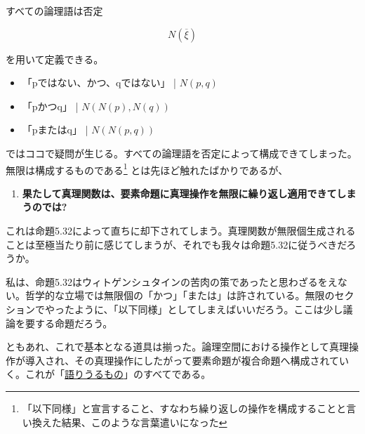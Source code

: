 \documentclass[a4paper,onecolumn,article]{jarticle}
\newcounter{ct}               %
\begin{document}
すべての論理語は否定

\[ N ( \overline{ \xi } ) \]

を用いて定義できる。

\begin{itemize}
  \item 「pではない、かつ、qではない」 | $N(p, q)$
  \item 「pかつq」 | $N(N(p), N(q))$
  \item 「pまたはq」 | $N(N(p, q))$
\end{itemize}

ではココで疑問が生じる。すべての論理語を否定によって構成できてしまった。無限は構成するものである\footnote{「以下同様」と宣言すること、すなわち繰り返しの操作を構成することと言い換えた結果、このような言葉遣いになった}
とは先ほど触れたばかりであるが、

\begin{enumerate}
  \item {\bf 果たして真理関数は、要素命題に真理操作を無限に繰り返し適用できてしまうのでは? }
\end{enumerate}

これは命題5.32によって直ちに却下されてしまう。真理関数が無限個生成されることは至極当たり前に感じてしまうが、それでも我々は命題5.32に従うべきだろうか。

私は、命題5.32はウィトゲンシュタインの苦肉の策であったと思わざるをえない。哲学的な立場では無限個の「かつ」「または」は許されている。無限のセクションでやったように、「以下同様」としてしまえばいいだろう。ここは少し議論を要する命題だろう。

ともあれ、これで基本となる道具は揃った。論理空間における操作として真理操作が導入され、その真理操作にしたがって要素命題が複合命題へ構成されていく。これが「\underline{語りうるもの}」のすべてである。
%
%
%
%
\end{document}
